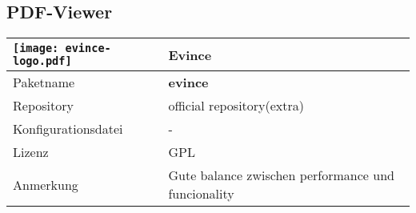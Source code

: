 \subsection{PDF-Viewer}
\begin{tabular}{l|l}
\texttt{[image: evince-logo.pdf]} & Evince \\ \hline
Paketname & \textbf{evince} \\ 
Repository & official repository(extra) \\
Konfigurationsdatei & - \\
Lizenz & GPL \\
Anmerkung & Gute balance zwischen performance und funcionality \\
\end{tabular}
